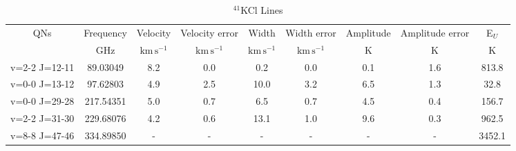 \begin{table*}[htp]
\centering
\caption{$^{41}$KCl Lines}
\begin{tabular}{ccccccccc}
\label{tab:41KCl_salt_lines}
QNs & Frequency & Velocity & Velocity error & Width & Width error & Amplitude & Amplitude error & E$_U$ \\
 & $\mathrm{GHz}$ & $\mathrm{km\,s^{-1}}$ & $\mathrm{km\,s^{-1}}$ & $\mathrm{km\,s^{-1}}$ & $\mathrm{km\,s^{-1}}$ & $\mathrm{K}$ & $\mathrm{K}$ & $\mathrm{K}$ \\
\hline
v=2-2 J=12-11 & 89.03049 & 8.2 & 0.0 & 0.2 & 0.0 & 0.1 & 1.6 & 813.8 \\
v=0-0 J=13-12 & 97.62803 & 4.9 & 2.5 & 10.0 & 3.2 & 6.5 & 1.3 & 32.8 \\
v=0-0 J=29-28 & 217.54351 & 5.0 & 0.7 & 6.5 & 0.7 & 4.5 & 0.4 & 156.7 \\
v=2-2 J=31-30 & 229.68076 & 4.2 & 0.6 & 13.1 & 1.0 & 9.6 & 0.3 & 962.5 \\
v=8-8 J=47-46 & 334.89850 & - & - & - & - & - & - & 3452.1 \\
\hline
\end{tabular}

\par 
\end{table*}
